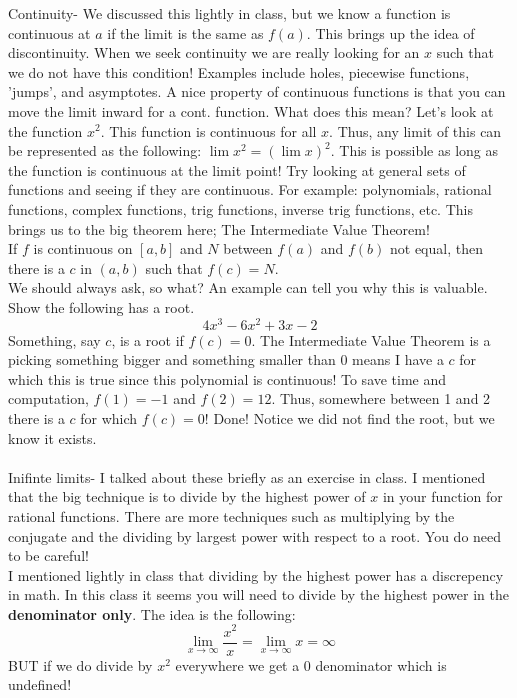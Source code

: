 \documentclass[10pt]{article}
\newcommand{\ds}{\displaystyle}
\theoremstyle{Theorem}
\theoremstyle{definition}
\theoremstyle{remark}
\theoremstyle{custom}
\begin{document}
Continuity- We discussed this lightly in class, but we know a function is continuous at $a$ if the limit is the same as $f(a)$. This brings up the idea of discontinuity. When we seek continuity we are really looking for an $x$ such that we do not have this condition! Examples include holes, piecewise functions, 'jumps', and asymptotes. A nice property of continuous functions is that you can move the limit inward for a cont. function. What does this mean? Let's look at the function $x^2$. This function is continuous for all $x$. Thus, any limit of this can be represented as the following: $\lim x^2=(\lim x)^2$. This is possible as long as the function is continuous at the limit point! Try looking at general sets of functions and seeing if they are continuous. For example: polynomials, rational functions, complex functions, trig functions, inverse trig functions, etc. This brings us to the big theorem here; The Intermediate Value Theorem!\\ If $f$ is continuous on $[a,b]$ and $N$ between $f(a)$ and $f(b)$ not equal, then there is a $c$ in $(a,b)$ such that $f(c)=N$. \\
We should always ask, so what? An example can tell you why this is valuable.\\
Show the following has a root.
$$4x^3-6x^2+3x-2$$
Something, say $c$, is a root if $f(c)=0$. The Intermediate Value Theorem is a picking something bigger and something smaller than 0 means I have a $c$ for which this is true since this polynomial is continuous! To save time and computation, $f(1)=-1$ and $f(2)=12$. Thus, somewhere between 1 and 2 there is a $c$ for which $f(c)=0$! Done! Notice we did not find the root, but we know it exists.\\\\
Inifinte limits- I talked about these briefly as an exercise in class. I mentioned that the big technique is to divide by the highest power of $x$ in your function for rational functions. There are more techniques such as multiplying by the conjugate and the dividing by largest power with respect to a root. You do need to be careful!\\
I mentioned lightly in class that dividing by the highest power has a discrepency in math. In this class it seems you will need to divide by the highest power in the \textbf{denominator only}. The idea is the following: 
$$\ds \lim_{x\rightarrow \infty}\dfrac{x^2}{x}=\ds \lim_{x\rightarrow \infty} x=\infty$$
BUT if we do divide by $x^2$ everywhere we get a 0 denominator which is undefined!\\
\end{document}
